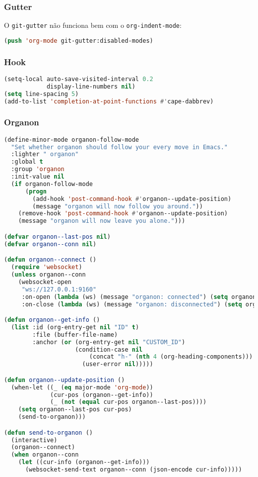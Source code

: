 \documentclass[11pt]{article}
\begin{document}
\subsubsection{Gutter}
\label{sec:gutter}
O \texttt{git-gutter} não funciona bem com o \texttt{org-indent-mode}:

\begin{lstlisting}[language=Lisp]
(push 'org-mode git-gutter:disabled-modes)
\end{lstlisting}

\subsubsection{Hook}
\label{sec:hook}
\begin{lstlisting}[language=Lisp]
(setq-local auto-save-visited-interval 0.2
            display-line-numbers nil)
(setq line-spacing 5)
(add-to-list 'completion-at-point-functions #'cape-dabbrev)
\end{lstlisting}

\subsubsection{Organon}
\label{sec:organon}
\begin{lstlisting}[language=Lisp]
(define-minor-mode organon-follow-mode
  "Set whether organon should follow your every move in Emacs."
  :lighter " organon"
  :global t
  :group 'organon
  :init-value nil
  (if organon-follow-mode
      (progn
        (add-hook 'post-command-hook #'organon--update-position)
        (message "organon will now follow you around."))
    (remove-hook 'post-command-hook #'organon--update-position)
    (message "organon will now leave you alone.")))

(defvar organon--last-pos nil)
(defvar organon--conn nil)

(defun organon--connect ()
  (require 'websocket)
  (unless organon--conn
    (websocket-open
     "ws://127.0.0.1:9160"
     :on-open (lambda (ws) (message "organon: connected") (setq organon--conn ws))
     :on-close (lambda (ws) (message "organon: disconnected") (setq organon--conn nil)))))

(defun organon--get-info ()
  (list :id (org-entry-get nil "ID" t)
        :file (buffer-file-name)
        :anchor (or (org-entry-get nil "CUSTOM_ID")
                    (condition-case nil
                        (concat "h-" (nth 4 (org-heading-components)))
                      (user-error nil)))))

(defun organon--update-position ()
  (when-let ((_ (eq major-mode 'org-mode))
             (cur-pos (organon--get-info))
             (_ (not (equal cur-pos organon--last-pos))))
    (setq organon--last-pos cur-pos)
    (send-to-organon)))

(defun send-to-organon ()
  (interactive)
  (organon--connect)
  (when organon--conn
    (let ((cur-info (organon--get-info)))
      (websocket-send-text organon--conn (json-encode cur-info)))))
\end{lstlisting}
\end{document}
